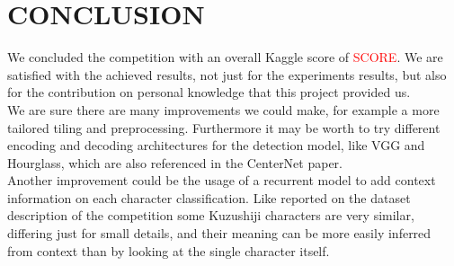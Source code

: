 \section{CONCLUSION}
\label{sec:conclusion}

We concluded the competition with an overall Kaggle score of \textcolor{red}{SCORE}.
We are satisfied with the achieved results, not just for the experiments results, but also for the contribution on personal knowledge that this project provided us.\\
We are sure there are many improvements we could make, for example a more tailored tiling and preprocessing. Furthermore it may be worth to try different encoding and decoding architectures for the detection model, like VGG and Hourglass, which are also referenced in the CenterNet paper.\\
Another improvement could be the usage of a recurrent model to add context information on each character classification. Like reported on the dataset description of the competition some Kuzushiji characters are very similar, differing just for small details, and their meaning can be more easily inferred from context than by looking at the single character itself.\\

